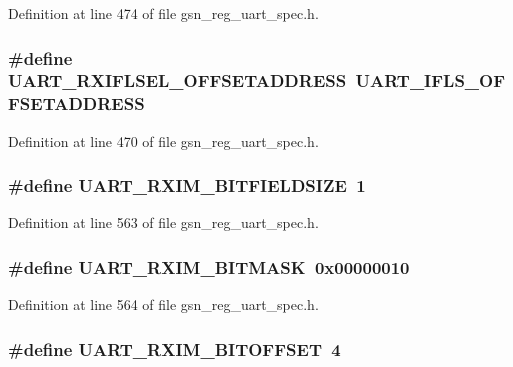 Definition at line 474 of file gsn\_\-reg\_\-uart\_\-spec.h.

\hypertarget{a00575_a689705ba0a5d62d9d57cde9a42467899}{
\subsubsection[{UART\_\-RXIFLSEL\_\-OFFSETADDRESS}]{\setlength{\rightskip}{0pt plus 5cm}\#define UART\_\-RXIFLSEL\_\-OFFSETADDRESS~UART\_\-IFLS\_\-OFFSETADDRESS}}
\label{a00575_a689705ba0a5d62d9d57cde9a42467899}


Definition at line 470 of file gsn\_\-reg\_\-uart\_\-spec.h.

\hypertarget{a00575_afc1f7641db425412c48a850e80047096}{
\subsubsection[{UART\_\-RXIM\_\-BITFIELDSIZE}]{\setlength{\rightskip}{0pt plus 5cm}\#define UART\_\-RXIM\_\-BITFIELDSIZE~1}}
\label{a00575_afc1f7641db425412c48a850e80047096}


Definition at line 563 of file gsn\_\-reg\_\-uart\_\-spec.h.

\hypertarget{a00575_a806b2a666dd4816efa0a7cc1007afe8d}{
\subsubsection[{UART\_\-RXIM\_\-BITMASK}]{\setlength{\rightskip}{0pt plus 5cm}\#define UART\_\-RXIM\_\-BITMASK~0x00000010}}
\label{a00575_a806b2a666dd4816efa0a7cc1007afe8d}


Definition at line 564 of file gsn\_\-reg\_\-uart\_\-spec.h.

\hypertarget{a00575_ad1d8486b526aa57a5d0b19a34b76f5cd}{
\subsubsection[{UART\_\-RXIM\_\-BITOFFSET}]{\setlength{\rightskip}{0pt plus 5cm}\#define UART\_\-RXIM\_\-BITOFFSET~4}}
\label{a00575_ad1d8486b526aa57a5d0b19a34b76f5cd}


